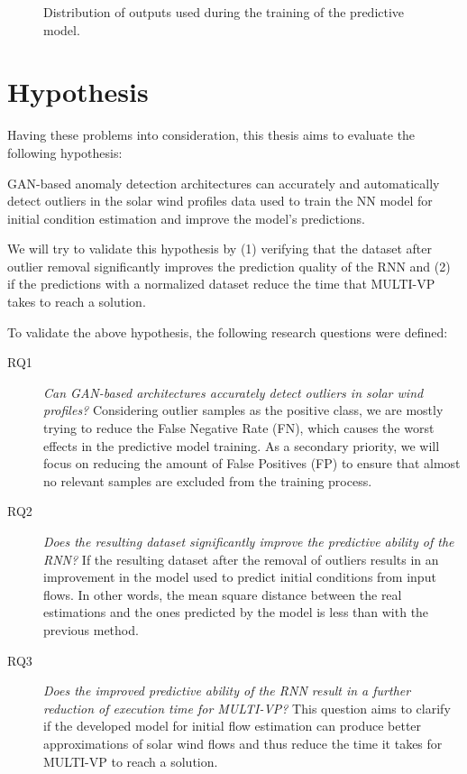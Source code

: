 \begin{figure}[ht]
\begin{subfigure}[b]{0.32\textwidth}
     \end{subfigure}
     \hfill
        \caption{Distribution of outputs used during the training of the predictive model.}
        \label{fig:output_distrib_bp}
\end{figure}


\section{Hypothesis}\label{sec:hypothesis}
Having these problems into consideration, this thesis aims to evaluate the following hypothesis:
\begin{adjustwidth}{2cm}{}
    GAN-based anomaly detection architectures can accurately and automatically detect outliers in the solar wind profiles data used to train the NN model for initial condition estimation and improve the model's predictions.
\end{adjustwidth}

We will try to validate this hypothesis by (1) verifying that the dataset after outlier removal significantly improves the prediction quality of the RNN and (2) if the predictions with a normalized dataset reduce the time that MULTI-VP takes to reach a solution.

To validate the above hypothesis, the following research questions were defined:

\begin{description}
    \item[RQ1] \textit{Can GAN-based architectures accurately detect outliers in solar wind profiles?} Considering outlier samples as the positive class, we are mostly trying to reduce the False Negative Rate (FN), which causes the worst effects in the predictive model training. As a secondary priority, we will focus on reducing the amount of False Positives (FP) to ensure that almost no relevant samples are excluded from the training process.
    \item[RQ2] \textit{Does the resulting dataset significantly improve the predictive ability of the RNN?} If the resulting dataset after the removal of outliers results in an improvement in the model used to predict initial conditions from input flows. In other words, the mean square distance between the real estimations and the ones predicted by the model is less than with the previous method.
    \item[RQ3] \textit{Does the improved predictive ability of the RNN result in a further reduction of execution time for MULTI-VP?} This question aims to clarify if the developed model for initial flow estimation can produce better approximations of solar wind flows and thus reduce the time it takes for MULTI-VP to reach a solution.
\end{description}

